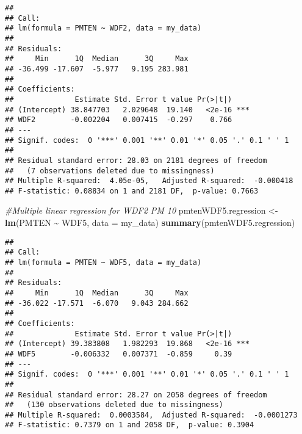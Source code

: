 \documentclass[
]{article}
\newenvironment{Shaded}{\begin{snugshade}}{\end{snugshade}}
\newcommand{\AttributeTok}[1]{\textcolor[rgb]{0.13,0.29,0.53}{#1}}
\newcommand{\CommentTok}[1]{\textcolor[rgb]{0.56,0.35,0.01}{\textit{#1}}}
\newcommand{\FunctionTok}[1]{\textcolor[rgb]{0.13,0.29,0.53}{\textbf{#1}}}
\newcommand{\NormalTok}[1]{#1}
\newcommand{\OtherTok}[1]{\textcolor[rgb]{0.56,0.35,0.01}{#1}}
\newcommand{\SpecialCharTok}[1]{\textcolor[rgb]{0.81,0.36,0.00}{\textbf{#1}}}
\begin{document}
\begin{verbatim}
## 
## Call:
## lm(formula = PMTEN ~ WDF2, data = my_data)
## 
## Residuals:
##     Min      1Q  Median      3Q     Max 
## -36.499 -17.607  -5.977   9.195 283.981 
## 
## Coefficients:
##              Estimate Std. Error t value Pr(>|t|)    
## (Intercept) 38.847703   2.029648  19.140   <2e-16 ***
## WDF2        -0.002204   0.007415  -0.297    0.766    
## ---
## Signif. codes:  0 '***' 0.001 '**' 0.01 '*' 0.05 '.' 0.1 ' ' 1
## 
## Residual standard error: 28.03 on 2181 degrees of freedom
##   (7 observations deleted due to missingness)
## Multiple R-squared:  4.05e-05,   Adjusted R-squared:  -0.000418 
## F-statistic: 0.08834 on 1 and 2181 DF,  p-value: 0.7663
\end{verbatim}

\begin{Shaded}
\begin{Highlighting}[]
\CommentTok{\#Multiple linear regression for WDF2 PM 10 }
\NormalTok{pmtenWDF5.regression }\OtherTok{\textless{}{-}} \FunctionTok{lm}\NormalTok{(PMTEN }\SpecialCharTok{\textasciitilde{}}\NormalTok{ WDF5, }\AttributeTok{data =}\NormalTok{ my\_data)}
\FunctionTok{summary}\NormalTok{(pmtenWDF5.regression)}
\end{Highlighting}
\end{Shaded}

\begin{verbatim}
## 
## Call:
## lm(formula = PMTEN ~ WDF5, data = my_data)
## 
## Residuals:
##     Min      1Q  Median      3Q     Max 
## -36.022 -17.571  -6.070   9.043 284.662 
## 
## Coefficients:
##              Estimate Std. Error t value Pr(>|t|)    
## (Intercept) 39.383808   1.982293  19.868   <2e-16 ***
## WDF5        -0.006332   0.007371  -0.859     0.39    
## ---
## Signif. codes:  0 '***' 0.001 '**' 0.01 '*' 0.05 '.' 0.1 ' ' 1
## 
## Residual standard error: 28.27 on 2058 degrees of freedom
##   (130 observations deleted due to missingness)
## Multiple R-squared:  0.0003584,  Adjusted R-squared:  -0.0001273 
## F-statistic: 0.7379 on 1 and 2058 DF,  p-value: 0.3904
\end{verbatim}
\end{document}
